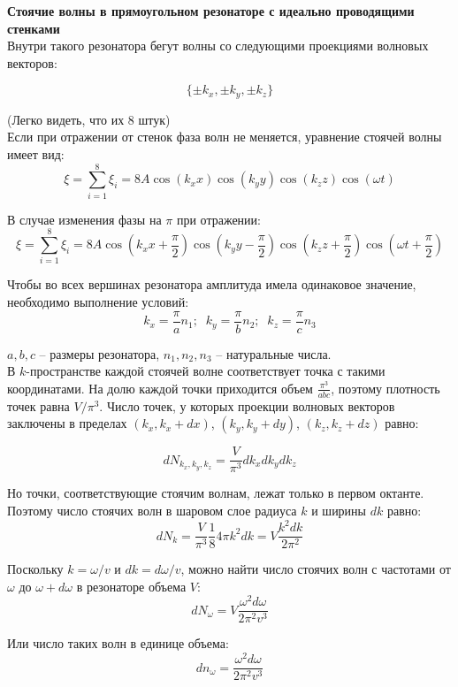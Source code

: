 \documentclass{article}
\begin{document}
	
	\textbf{Стоячие волны в прямоугольном резонаторе с идеально проводящими стенками}\\

	Внутри такого резонатора бегут волны со следующими проекциями волновых векторов:

	\begin{equation}
		\{\pm k_x, \pm k_y, \pm k_z\}
	\end{equation}

	(Легко видеть, что их 8 штук)\\

	Если при отражении от стенок фаза волн не меняется, уравнение стоячей волны имеет вид:
	\begin{equation}
		\xi = \sum_{i=1}^8 \xi_i = 8A\cos(k_x x)\cos(k_y y)\cos(k_z z)\cos(\omega t)
	\end{equation}

	В случае изменения фазы на $\pi$ при отражении:
	\begin{equation}
		\xi = \sum_{i=1}^8 \xi_i = 8A\cos(k_x x + \frac{\pi}{2})\cos(k_y y - \frac{\pi}{2})\cos(k_z z + \frac{\pi}{2})\cos(\omega t + \frac{\pi}{2})
	\end{equation}

	Чтобы во всех вершинах резонатора амплитуда имела одинаковое значение, необходимо выполнение условий:
	\begin{equation}
		k_x = \frac{\pi}{a}n_1;\;\;k_y = \frac{\pi}{b}n_2;\;\;k_z = \frac{\pi}{c}n_3
	\end{equation}

	$a, b, c$ -- размеры резонатора, $n_1, n_2, n_3$ -- натуральные числа.\\

	В $k$-пространстве каждой стоячей волне соответствует точка с такими координатами. На долю каждой точки приходится объем $\frac{\pi^3}{abc}$, поэтому плотность точек равна $V/\pi^3$. Число точек, у которых проекции волновых векторов заключены в пределах $(k_x,k_x+dx)$, $(k_y,k_y+dy)$, $(k_z,k_z+dz)$ равно:

	\begin{equation}
		dN_{k_x,k_y,k_z} = \frac{V}{\pi^3}dk_x dk_y dk_z
	\end{equation}

	Но точки, соответствующие стоячим волнам, лежат только в первом октанте. Поэтому число стоячих волн в шаровом слое радиуса $k$ и ширины $dk$ равно:
	\begin{equation}
		dN_k = \frac{V}{\pi^3}\frac{1}{8}4\pi k^2 dk = V\frac{k^2 dk}{2\pi^2}
	\end{equation}

	Поскольку $k=\omega/v$ и $dk = d\omega/v$, можно найти число стоячих волн с частотами от $\omega$ до $\omega+d\omega$ в резонаторе объема $V$:
	\begin{equation}
		dN_\omega = V\frac{\omega^2 d\omega}{2\pi^2 v^3}
	\end{equation}

	Или число таких волн в единице объема:
	\begin{equation}
		dn_\omega = \frac{\omega^2 d\omega}{2\pi^2 v^3}
	\end{equation}

	
\end{document}
